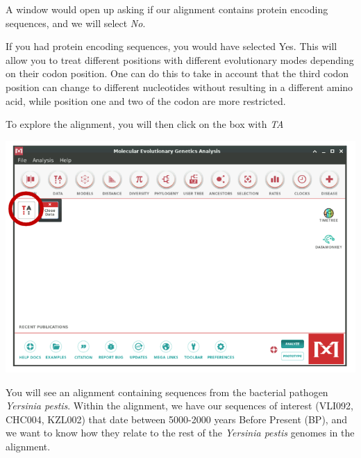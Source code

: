 \documentclass[
  letterpaper,
]{book}
\begin{document}
A window would open up asking if our alignment contains protein encoding
sequences, and we will select \emph{No}.

\begin{tcolorbox}[enhanced jigsaw, opacitybacktitle=0.6, bottomtitle=1mm, opacityback=0, colback=white, coltitle=black, leftrule=.75mm, toprule=.15mm, title=\textcolor{quarto-callout-tip-color}{\faLightbulb}\hspace{0.5em}{Tip}, colframe=quarto-callout-tip-color-frame, toptitle=1mm, arc=.35mm, left=2mm, titlerule=0mm, breakable, rightrule=.15mm, bottomrule=.15mm, colbacktitle=quarto-callout-tip-color!10!white]

If you had protein encoding sequences, you would have selected Yes. This
will allow you to treat different positions with different evolutionary
modes depending on their codon position. One can do this to take in
account that the third codon position can change to different
nucleotides without resulting in a different amino acid, while position
one and two of the codon are more restricted.

\end{tcolorbox}

To explore the alignment, you will then click on the box with \emph{TA}

\includegraphics{assets/images/chapters/phylogenomics/5.png}

You will see an alignment containing sequences from the bacterial
pathogen \emph{Yersinia pestis}. Within the alignment, we have our
sequences of interest (VLI092, CHC004, KZL002) that date between
5000-2000 years Before Present (BP), and we want to know how they relate
to the rest of the \emph{Yersinia pestis} genomes in the alignment.
\end{document}

